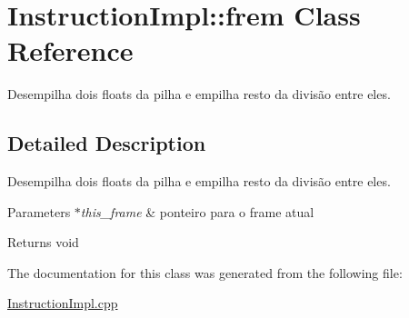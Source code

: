 \hypertarget{class_instruction_impl_1_1frem}{}\section{Instruction\+Impl\+:\+:frem Class Reference}
\label{class_instruction_impl_1_1frem}


Desempilha dois floats da pilha e empilha resto da divisão entre eles.  




\subsection{Detailed Description}
Desempilha dois floats da pilha e empilha resto da divisão entre eles. 


\begin{DoxyParams}{Parameters}
{\em $\ast$this\+\_\+frame} & ponteiro para o frame atual \\
\hline
\end{DoxyParams}
\begin{DoxyReturn}{Returns}
void 
\end{DoxyReturn}


The documentation for this class was generated from the following file\+:\begin{DoxyCompactItemize}
\item 
\hyperlink{_instruction_impl_8cpp}{Instruction\+Impl.\+cpp}\end{DoxyCompactItemize}
